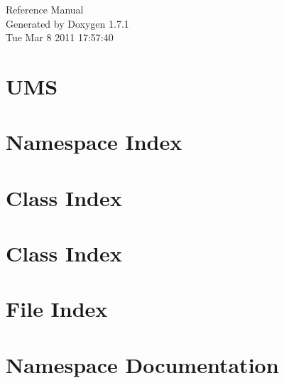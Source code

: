 \documentclass[a4paper]{book}
\begin{document}
\hypersetup{pageanchor=false}
\begin{titlepage}
\vspace*{7cm}
\begin{center}
{\Large Reference Manual}\\
\vspace*{1cm}
{\large Generated by Doxygen 1.7.1}\\
\vspace*{0.5cm}
{\small Tue Mar 8 2011 17:57:40}\\
\end{center}
\end{titlepage}
\clearemptydoublepage
{}
\tableofcontents
\clearemptydoublepage
{}
\hypersetup{pageanchor=true}
\chapter{UMS}
\label{index}\hypertarget{index}{}
\chapter{Namespace Index}

\chapter{Class Index}

\chapter{Class Index}

\chapter{File Index}

\chapter{Namespace Documentation}

\end{document}
